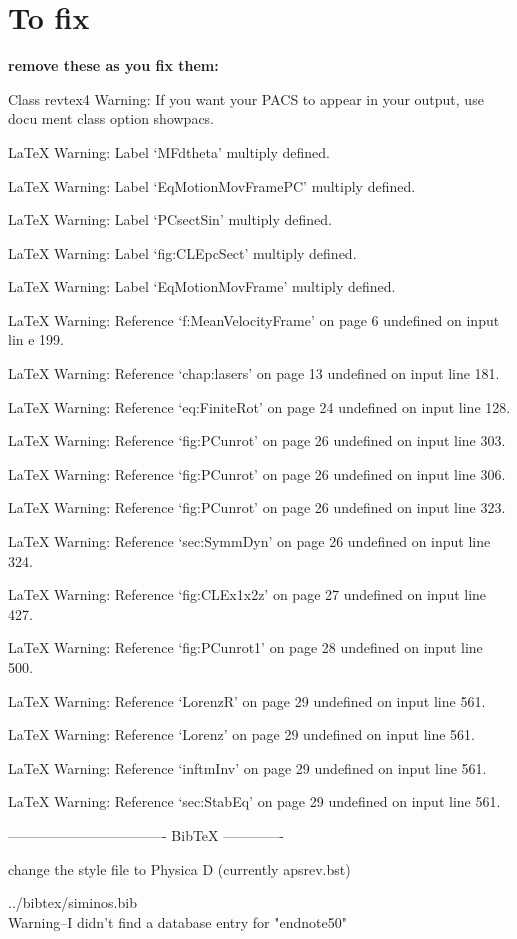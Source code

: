 
\section*{To fix}

{\bf remove these as you fix them:}

Class revtex4 Warning: If you want your PACS to appear in your output, use docu
ment class option showpacs.


LaTeX Warning: Label `MFdtheta' multiply defined.


LaTeX Warning: Label `EqMotionMovFramePC' multiply defined.


LaTeX Warning: Label `PCsectSin' multiply defined.


LaTeX Warning: Label `fig:CLEpcSect' multiply defined.


LaTeX Warning: Label `EqMotionMovFrame' multiply defined.

LaTeX Warning: Reference `f:MeanVelocityFrame' on page 6 undefined on input lin
e 199.


LaTeX Warning: Reference `chap:lasers' on page 13 undefined on input line 181.


LaTeX Warning: Reference `eq:FiniteRot' on page 24 undefined on input line 128.


LaTeX Warning: Reference `fig:PCunrot' on page 26 undefined on input line 303.


LaTeX Warning: Reference `fig:PCunrot' on page 26 undefined on input line 306.


LaTeX Warning: Reference `fig:PCunrot' on page 26 undefined on input line 323.


LaTeX Warning: Reference `sec:SymmDyn' on page 26 undefined on input line 324.


LaTeX Warning: Reference `fig:CLEx1x2z' on page 27 undefined on input line 427.


LaTeX Warning: Reference `fig:PCunrot1' on page 28 undefined on input line 500.


LaTeX Warning: Reference `LorenzR' on page 29 undefined on input line 561.


LaTeX Warning: Reference `Lorenz' on page 29 undefined on input line 561.


LaTeX Warning: Reference `inftmInv' on page 29 undefined on input line 561.


LaTeX Warning: Reference `sec:StabEq' on page 29 undefined on input line 561.

---------------------------------- BibTeX -------------


change the style file to Physica D (currently apsrev.bst)

../bibtex/siminos.bib
\\
Warning--I didn't find a database entry for "endnote50"

